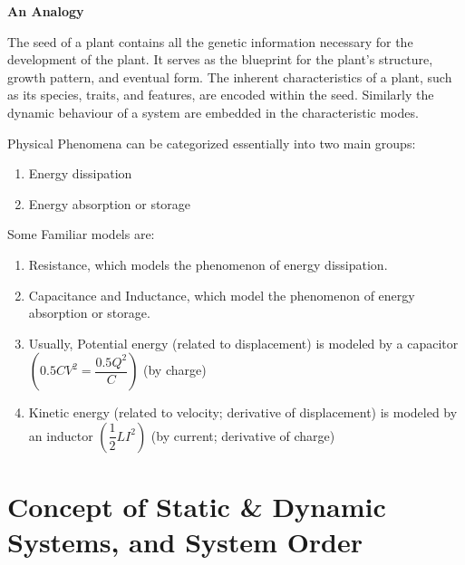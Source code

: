 \documentclass[
  14pt,
  a4paper,
  oneside,
  open=any,
  a4paper,
  14pt]{report}
\providecommand{\tightlist}{%
  \setlength{\itemsep}{0pt}\setlength{\parskip}{0pt}}\usepackage{longtable,booktabs,array}
\begin{document}
\begin{tcolorbox}[enhanced jigsaw, colframe=quarto-callout-note-color-frame, opacityback=0, leftrule=.75mm, colback=white, breakable, arc=.35mm, bottomrule=.15mm, rightrule=.15mm, left=2mm, toprule=.15mm]

\vspace{-3mm}\textbf{An Analogy}\vspace{3mm}

The seed of a plant contains all the genetic information necessary for
the development of the plant. It serves as the blueprint for the plant's
structure, growth pattern, and eventual form. The inherent
characteristics of a plant, such as its species, traits, and features,
are encoded within the seed. Similarly the dynamic behaviour of a system
are embedded in the characteristic modes.

\end{tcolorbox}

Physical Phenomena can be categorized essentially into two main groups:

\begin{enumerate}
\def\labelenumi{\arabic{enumi}.}
\tightlist
\item
  Energy dissipation
\item
  Energy absorption or storage
\end{enumerate}

Some Familiar models are:

\begin{enumerate}
\def\labelenumi{\roman{enumi}.}
\item
  Resistance, which models the phenomenon of energy dissipation.
\item
  Capacitance and Inductance, which model the phenomenon of energy
  absorption or storage.
\item
  Usually, Potential energy (related to displacement) is modeled by a
  capacitor \(\left(0.5CV^2=\dfrac{0.5Q^2}{C}\right)\) (by charge)
\item
  Kinetic energy (related to velocity; derivative of displacement) is
  modeled by an inductor \(\left(\dfrac{1}{2}LI^2\right)\) (by current;
  derivative of charge)
\end{enumerate}

\section{Concept of Static \& Dynamic Systems, and System
Order}\label{concept-of-static-dynamic-systems-and-system-order}
\end{document}
